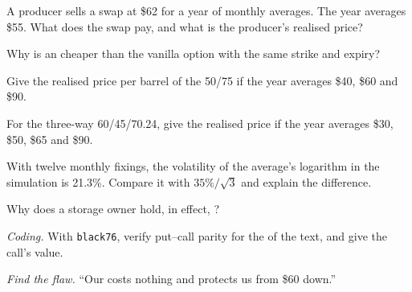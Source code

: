 \begin{exercise}[$\star$]\label{exo:m3:commodity-options-and-structured-hedges:1}
A producer sells a swap at \$62 for a year of monthly averages. The year averages \$55. What does the swap
pay, and what is the producer's realised price?
\end{exercise}

\begin{exercise}[$\star$]\label{exo:m3:commodity-options-and-structured-hedges:2}
Why is an  cheaper than the vanilla option with the same strike and expiry?
\end{exercise}

\begin{exercise}[$\star$]\label{exo:m3:commodity-options-and-structured-hedges:3}
Give the realised price per barrel of the 50/75  if the year averages \$40, \$60 and \$90.
\end{exercise}

\begin{exercise}[$\star\star$]\label{exo:m3:commodity-options-and-structured-hedges:4}
For the three-way 60/45/70.24, give the realised price if the year averages \$30, \$50, \$65 and \$90.
\end{exercise}

\begin{exercise}[$\star\star$]\label{exo:m3:commodity-options-and-structured-hedges:5}
With twelve monthly fixings, the volatility of the average's logarithm in the simulation is 21.3\%. Compare
it with $35\%/\sqrt3$ and explain the difference.
\end{exercise}

\begin{exercise}[$\star\star$]\label{exo:m3:commodity-options-and-structured-hedges:6}
Why does a storage owner hold, in effect, ?
\end{exercise}

\begin{exercise}[$\star\star\star$]\label{exo:m3:commodity-options-and-structured-hedges:7}
\emph{Coding.} With \texttt{black76}, verify put--call parity for the  of the text, and give
the call's value.
\end{exercise}

\begin{exercise}[$\star\star\star$]\label{exo:m3:commodity-options-and-structured-hedges:8}
\emph{Find the flaw.} ``Our  costs nothing and protects us from \$60 down.''
\end{exercise}

